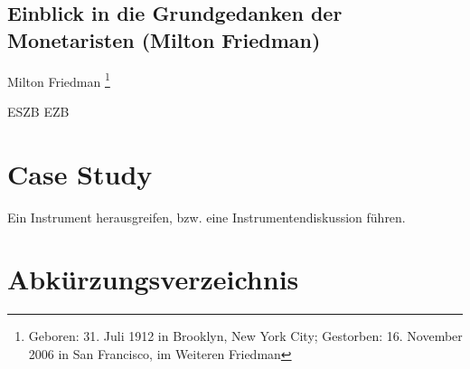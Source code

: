 \documentclass[
onecolumn,
a4paper,
abstracton,
parskip=half
,final
]{scrartcl}
\begin{document}
\subsection{Einblick in die Grundgedanken der Monetaristen (Milton Friedman)}
Milton Friedman \footnote[16]{Geboren: 31. Juli 1912 in Brooklyn, New York City; Gestorben: 16. November 2006 in San Francisco, im Weiteren Friedman}

\clearpage
\ac{ESZB}
\ac{EZB}



\section{Case Study}
\label{sec4:CaseStudy}
Ein Instrument herausgreifen, bzw. eine Instrumentendiskussion f{\"u}hren.

\subsection{}
\subsection{}
\subsection{}











\clearpage

\section{Abk{\"u}rzungsverzeichnis}
\label{sec5:Abkuerzungsverzeichnis}

\begin{acronym}[ESZB]





\end{acronym}

\vspace{10pt}
	\newpage
\singlespacing
\end{document}
